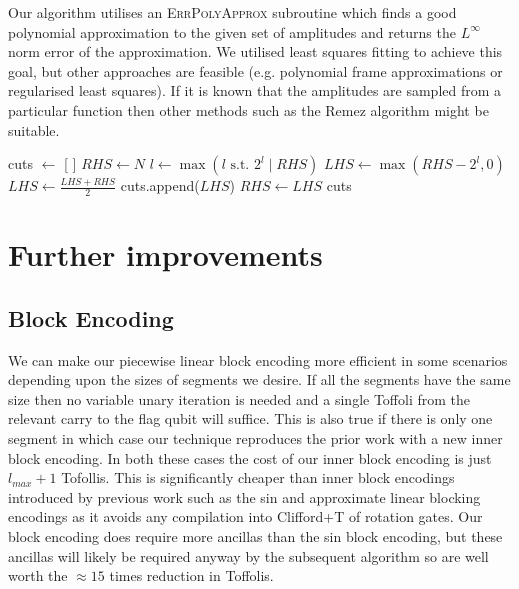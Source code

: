 Our algorithm utilises an \textsc{\footnotesize ErrPolyApprox} subroutine which finds a good polynomial approximation to the given set of amplitudes and returns the $L^\infty$ norm error of the approximation. We utilised least squares fitting to achieve this goal, but other approaches are feasible (e.g. polynomial frame approximations or regularised least squares). If it is known that the amplitudes are sampled from a particular function then other methods such as the Remez algorithm might be suitable.
\begin{algorithm}[hbtp]
\caption{Performs at most $N\log_2 N$ queries to \textsc{ErrPolyApprox} and returns the optimal cuts between the pieces of the polynomial}
\label{alg:piecewise_classical_approx}
\begin{algorithmic}[1]
\State cuts $\gets$ [ ]
\State $RHS \gets N$
    \State $l \gets \max \left( l \text{ s.t. } 2^l \mid RHS \right)$
    \State $LHS \gets \max(RHS - 2^l, 0)$
        \State $LHS \gets \frac{LHS + RHS}{2}$
    \EndWhile
    \State cuts.append($LHS$)
    \State $RHS \gets LHS$
\EndWhile
\State \Return cuts
\end{algorithmic}
\end{algorithm}
\section{Further improvements}
\subsection{Block Encoding}
\label{section:improve-be}We can make our piecewise linear block encoding more efficient in some scenarios depending upon the sizes of segments we desire. If all the segments have the same size then no variable unary iteration is needed and a single Toffoli from the relevant carry to the flag qubit will suffice. This is also true if there is only one segment in which case our technique reproduces the prior work \cite{mcardleQuantumStatePreparation2022} with a new inner block encoding. In both these cases the cost of our inner block encoding is just $l_{max} + 1$ Tofollis. This is significantly cheaper than inner block encodings introduced by previous work such as the sin \cite{mcardleQuantumStatePreparation2022} and approximate linear \cite{Gonzalez-Conde:2023fjg} blocking encodings as it avoids any compilation into Clifford+T of rotation gates\footnotemark[3]. Our block encoding does require more ancillas than the sin block encoding, but these ancillas will likely be required anyway by the subsequent algorithm so are well worth the $\approx 15$ times reduction in Toffolis.


